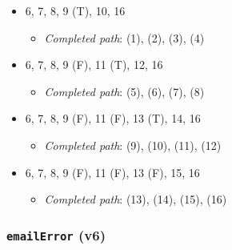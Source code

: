 \documentclass{article}
\newcommand{\completedpath}{\textit{Completed path}}
\begin{document}
\begin{itemize}
    \item 6, 7, 8, 9 (T), 10, 16
    \begin{itemize}
        \item \completedpath: (1), (2), (3), (4)
    \end{itemize}
    \item 6, 7, 8, 9 (F), 11 (T), 12, 16
    \begin{itemize}
        \item \completedpath: (5), (6), (7), (8)
    \end{itemize}
    \item 6, 7, 8, 9 (F), 11 (F), 13 (T), 14, 16
    \begin{itemize}
        \item \completedpath: (9), (10), (11), (12)
    \end{itemize}
    \item 6, 7, 8, 9 (F), 11 (F), 13 (F), 15, 16
    \begin{itemize}
        \item \completedpath: (13), (14), (15), (16)
    \end{itemize}
\end{itemize}

\subsubsection*{\texttt{emailError} (v6)}
\end{document}
